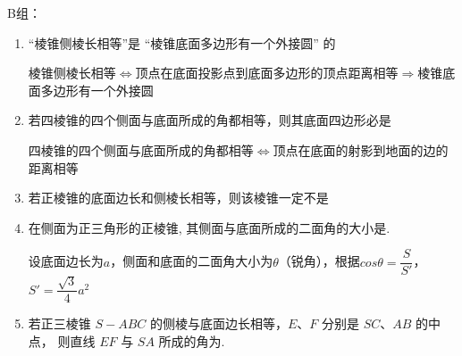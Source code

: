 B组：

\begin{enumerate}
    \item “棱锥侧棱长相等”是 “棱锥底面多边形有一个外接圆” 的 
    \begin{jieda}
        棱锥侧棱长相等$\Longleftrightarrow$顶点在底面投影点到底面多边形的顶点距离相等$\Longrightarrow$棱锥底面多边形有一个外接圆
    \end{jieda}
    
    \item 若四棱锥的四个侧面与底面所成的角都相等，则其底面四边形必是
    \begin{jieda}
        四棱锥的四个侧面与底面所成的角都相等$\Longleftrightarrow$顶点在底面的射影到地面的边的距离相等
    \end{jieda}

    \item 若正棱锥的底面边长和侧棱长相等，则该棱锥一定不是   
    
    \item 在侧面为正三角形的正棱锥, 其侧面与底面所成的二面角的大小是.
    \begin{jieda}
        设底面边长为$a$，侧面和底面的二面角大小为$\theta$（锐角），根据$cos\theta = \dfrac{S}{S'}$，$S' = \dfrac{\sqrt{3}}{4}a^2$
    \end{jieda}
    
    \item 若正三棱锥 $S-ABC$ 的侧棱与底面边长相等，$E$、$F$ 分别是 $SC$、$AB$ 的中点， 则直线 $EF$ 与 $SA$ 所成的角为.


\end{enumerate}
